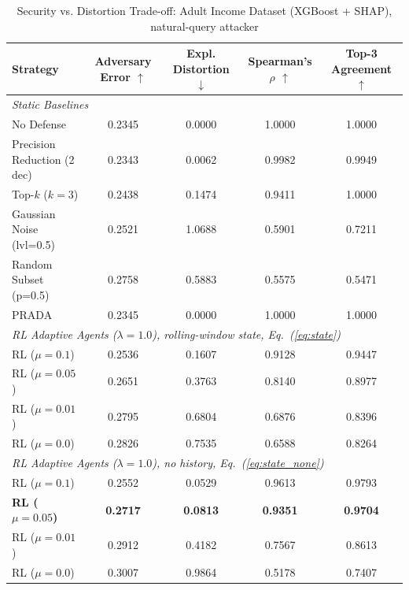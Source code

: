 \documentclass[conference]{IEEEtran}
\DeclareRobustCommand{\rev}[1]{{\color{blue}#1}}
\DeclareRobustCommand{\revnew}[1]{{\color{revpurple}#1}}
\begin{document}
\begin{table}[t]
\caption{Security vs. Distortion Trade-off: Adult Income Dataset (XGBoost + SHAP)\rev{, natural-query attacker}}
\begin{center}
{\footnotesize
\begin{tabular}{lcccc}
\toprule
\textbf{Strategy} & \textbf{\rev{Adversary Error} $\uparrow$} & \textbf{\rev{Expl. Distortion} $\downarrow$} & \textbf{Spearman's $\rho$ $\uparrow$} & \textbf{Top-3 Agreement $\uparrow$} \\
\midrule
\multicolumn{5}{l}{\textit{Static Baselines}} \\
\rev{No Defense} & \rev{0.2345} & \rev{0.0000} & \rev{1.0000} & \rev{1.0000} \\
\rev{Precision Reduction (2 dec)} & \rev{0.2343} & \rev{0.0062} & \rev{0.9982} & \rev{0.9949} \\
\rev{Top-$k$ ($k=3$)} & \rev{0.2438} & \rev{0.1474} & \rev{0.9411} & \rev{1.0000} \\
\rev{Gaussian Noise (lvl=0.5)} & \rev{0.2521} & \rev{1.0688} & \rev{0.5901} & \rev{0.7211} \\
\rev{Random Subset (p=0.5)} & \rev{0.2758} & \rev{0.5883} & \rev{0.5575} & \rev{0.5471} \\
\rev{PRADA \cite{b17}} & \rev{0.2345} & \rev{0.0000} & \rev{1.0000} & \rev{1.0000} \\
\midrule
\multicolumn{5}{l}{\textit{RL Adaptive Agents ($\lambda=1.0$)\rev{, rolling-window state\revnew{, Eq.~(\ref{eq:state})}}}} \\
\rev{RL ($\mu = 0.1$)} & \rev{0.2536} & \rev{0.1607} & \rev{0.9128} & \rev{0.9447} \\
\rev{RL ($\mu = 0.05$)} & \rev{0.2651} & \rev{0.3763} & \rev{0.8140} & \rev{0.8977} \\
\rev{RL ($\mu = 0.01$)} & \rev{0.2795} & \rev{0.6804} & \rev{0.6876} & \rev{0.8396} \\
\rev{RL ($\mu = 0.0$)} & \rev{0.2826} & \rev{0.7535} & \rev{0.6588} & \rev{0.8264} \\
\midrule
\multicolumn{5}{l}{\rev{\textit{RL Adaptive Agents ($\lambda=1.0$), no history\revnew{, Eq.~(\ref{eq:state_none})}}}} \\
\rev{RL ($\mu = 0.1$)} & \rev{0.2552} & \rev{0.0529} & \rev{0.9613} & \rev{0.9793} \\
\rev{\textbf{RL ($\mu = 0.05$)}} & \rev{\textbf{0.2717}} & \rev{\textbf{0.0813}} & \rev{\textbf{0.9351}} & \rev{\textbf{0.9704}} \\
\rev{RL ($\mu = 0.01$)} & \rev{0.2912} & \rev{0.4182} & \rev{0.7567} & \rev{0.8613} \\
\rev{RL ($\mu = 0.0$)} & \rev{0.3007} & \rev{0.9864} & \rev{0.5178} & \rev{0.7407} \\
\bottomrule
\end{tabular}
}
\label{tab_adult}
\end{center}
\end{table}
\end{document}
